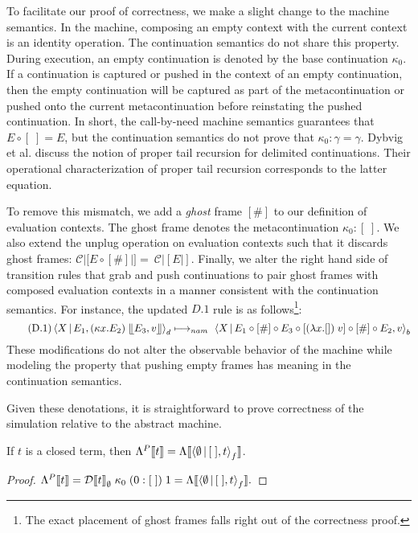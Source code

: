 \documentclass{LMCS}
\newcommand{\mtoc}[0]{\mathcal{C}}
\theoremstyle{plain}
\theoremstyle{remark}
\newcommand{\nam}[0]{\ensuremath{\longmapsto_{nam}}}
\renewcommand{\comp}[0]{\ensuremath{\circ}}
\newcommand{\answer}[1]{\llfloor#1\rrfloor}
\newcommand{\refocus}[1]{\Braket{#1}_f}
\newcommand{\rebuild}[1]{\Braket{#1}_b}
\newcommand{\reduce}[1]{\Braket{#1}_d}
\newcommand{\topic}[1]{}
\begin{document}
\topic{small modifications to the machine semantics to facilitate proving}
To facilitate our proof of correctness, we make a slight change to the machine
semantics.  In the machine, composing an empty context with the current
context is an identity operation.  The continuation semantics do not share
this property.  During execution, an empty continuation is denoted by the base
continuation $\kappa_0$.  If a continuation is captured or pushed in the
context of an empty continuation, then the empty continuation will be captured
as part of the metacontinuation or pushed onto the current metacontinuation
before reinstating the pushed continuation.  In short, the call-by-need machine
semantics guarantees that $E \comp [\;] = E$, but the continuation semantics do
not prove that $\kappa_0:\gamma = \gamma$.  Dybvig et al. discuss the notion of
proper tail recursion for delimited continuations.  Their operational
characterization of proper tail recursion corresponds to the latter equation.


To remove this mismatch, we add a \emph{ghost} frame $[\#]$ to our definition
of evaluation contexts.  The ghost frame denotes the metacontinuation
$\kappa_0:[\;]$.  We also extend the unplug operation on evaluation contexts
such that it discards ghost frames: $\mtoc |[E \comp [\#]|] =~\mtoc|[E|]$.
Finally, we alter the right hand side of transition rules that grab and push
continuations to pair ghost frames with composed evaluation contexts in a
manner consistent with the continuation semantics. For instance, the updated
$D.1$ rule is as follows\footnote{The exact placement of ghost frames falls
  right out of the correctness proof.}:
\begin{equation*}
\tag{D.1}  \reduce{X | E_1, (\kappa x.E_2)\;\answer{E_3,v}} \nam\ 
  \rebuild{X | E_1 \comp [\#] \comp E_3 \comp [(\lambda x.[])\; v] 
    \comp [\#] \comp E_2, v}
\end{equation*}
These modifications do not alter the observable behavior of the machine while
modeling the property that pushing empty frames has meaning in the
continuation semantics.  



Given these denotations, it is straightforward to prove correctness of the
simulation relative to the abstract machine.

\begin{thm}
  If $t$ is a closed term, then
  $\Lambda^P |[t|] = 
\Lambda |[\refocus{\emptyset | [\;],t} |]$.
\end{thm}
\begin{proof}
$ \Lambda^P |[t|] = \mathcal{D}|[ t |]_\emptyset \; \kappa_0 \; (0:[\;])\; 1  
  = \Lambda |[\refocus{\emptyset | [\;],t} |].$
\end{proof}
\end{document}
